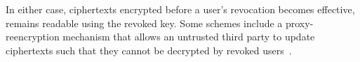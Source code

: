 In either case, ciphertexts encrypted before a user's revocation becomes effective, remains readable using the revoked key.
Some schemes include a proxy-reencryption mechanism that allows an untrusted third party to update ciphertexts such that they cannot be decrypted by revoked users~\cite{manna_sea-brew_2021}.







